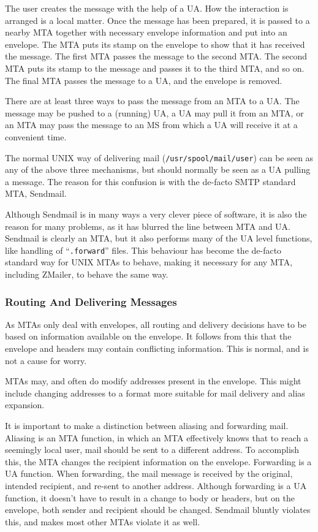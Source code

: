 The user creates the message with the help of a UA. How the interaction 
is arranged is a local matter. Once the message has been prepared, 
it is passed to a nearby MTA together with necessary envelope 
information and put into an envelope. The MTA puts its stamp on 
the envelope to show that it has received the message. The first 
MTA passes the message to the second MTA. The second MTA puts its 
stamp to the message and passes it to the third MTA, and so on. 
The final MTA passes the message to a UA, and the envelope is removed.

There are at least three ways to pass the message from an MTA to a UA. 
The message may be pushed to a (running) UA, a UA may pull it from an MTA, 
or an MTA may pass the message to an MS from which a UA will receive it at 
a convenient time.

The normal UNIX way of delivering mail ({\tt /usr/spool/mail/user})
can be seen as any of the above three mechanisms, but should normally
be seen as a UA pulling a message. The reason for this confusion is
with the de-facto SMTP standard MTA, Sendmail.

Although Sendmail is in many ways a very clever piece of software,
it is also the reason for many problems, as it has blurred the line
between MTA and UA. Sendmail is clearly an MTA, but it also performs
many of the UA level functions, like handling of ``{\tt .forward}''
files.  This behaviour has become the de-facto standard  way for UNIX
MTAs to behave, making it necessary for any MTA, including ZMailer,
to behave the same way.


\subsubsection{Routing And Delivering Messages}


As MTAs only deal with envelopes, all routing and delivery decisions have to be
based on information available on the envelope. It follows from this that 
the envelope and headers may contain conflicting information. This is normal, 
and is not a cause for worry.

MTAs may, and often do modify addresses present in the envelope. This might 
include changing addresses to a format more suitable for mail delivery and 
alias expansion.

It is important to make a distinction between aliasing and forwarding mail. 
Aliasing is an MTA function, in which an MTA effectively knows that to reach 
a seemingly local user, mail should be sent to a different address. 
To accomplish this, the MTA changes the recipient information on the envelope. 
Forwarding is a UA function. When forwarding, the mail message is received 
by the original, intended recipient, and re-sent to another address. Although 
forwarding is a UA function, it doesn't have to result in a change to body or 
headers, but on the envelope, both sender and recipient should be changed. 
Sendmail bluntly violates this, and makes most other MTAs violate it as well.

